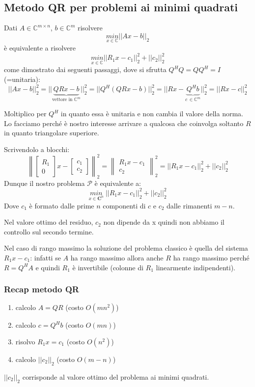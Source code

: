 \documentclass[12pt,a4paper,]{report}
\begin{document}
\subsection{Metodo QR per problemi ai minimi quadrati}
\begin{metodo}
Dati $A \in \mathbb{C}^{m\times n}$, $b \in \mathbb{C}^m$ risolvere
\[
\underset{x\in \mathbb{C}}{min}||Ax-b||_2 
\]
è equivalente a risolvere
\[
\underset{x\in \mathbb{C}}{min}||R_1x-c_1||_2^2+||c_2||_2^2 
\]
come dimostrato dai seguenti passaggi, dove si sfrutta $Q^HQ= QQ^H = I$ (=unitaria):
\[
||Ax - b||_2^2 = ||\underbrace{QRx - b}_{\text{vettore in } \mathbb{C}^m}||_2^2 = ||Q^H(QRx - b)||_2^2 = ||Rx - \underbrace{Q^H b}_{c\,\in\mathbb{C}^m}||_2^2 = ||Rx - c||_2^2
\]
\begin{nota}
    Moltiplico per $Q^H$ in quanto essa è unitaria e non cambia il valore della norma.\\
    Lo facciamo perché è nostro interesse arrivare a qualcosa che coinvolga soltanto $R$ in quanto triangolare superiore.
\end{nota}
\noindent
Scrivendolo a blocchi:
\[
\left\|\begin{bmatrix} R_1 \\ 0 \end{bmatrix} x - \begin{bmatrix} c_1 \\ c_2 \end{bmatrix}\right\|_2^2 = \left\|\begin{matrix} R_1 x - c_1 \\ c_2 \end{matrix}\right\|_2^2 = ||R_1 x - c_1||_2^2 + ||c_2||_2^2
\]
Dunque il nostro problema $\mathcal{P}$ è equivalente a:
\[
\underset{x\in\mathbf{C}^n}{min}\;||R_1 x - c_1||_2^2 + ||c_2||_2^2
\]
Dove $c_1$ è formato dalle prime $n$ componenti di $c$ e $c_2$ dalle rimanenti $m-n$.
\begin{nota}
    Nel valore ottimo del residuo, $c_2$ non dipende da x quindi non abbiamo il controllo sul secondo termine.
\end{nota}
Nel caso di rango massimo la soluzione del problema classico è quella del sistema $R_1x-c_1$: infatti se $A$ ha rango massimo allora anche $R$ ha rango massimo perché $R=Q^HA$ e quindi $R_1$ è invertibile (colonne di $R_1$ linearmente indipendenti).
\subsubsection{Recap metodo QR}
\begin{enumerate}
    \item calcolo $A=QR$ (costo $O(mn^2)$)
    \item calcolo $c=Q^Hb$ (costo $O(mn)$)
    \item risolvo $R_1x=c_1$ (costo $O(n^2)$)
    \item calcolo $||c_2||_2$ (costo $O(m-n)$)
\end{enumerate}
\begin{nota}
    $||c_2||_2$ corrisponde al valore ottimo del problema ai minimi quadrati.
\end{nota}
\end{metodo}
\end{document}

